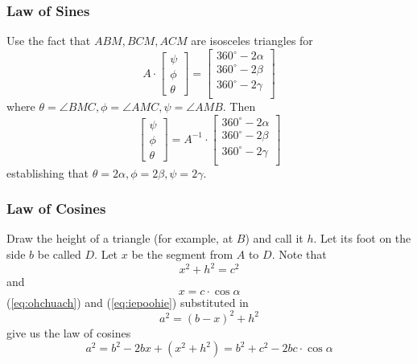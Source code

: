 \documentclass[xcolor=dvipsnames]{beamer}
\begin{document}
\begin{frame}
  \frametitle{Law of Sines}
    Use the fact that $ABM,BCM,ACM$ are isosceles triangles for
    \begin{equation}
      \label{eq:exiebohc}
      A\cdot\left[\begin{array}{c}
        \psi \\
              \phi \\
              \theta
            \end{array}\right]=\left[
            \begin{array}{c}
              360^{\circ}-2\alpha \\
              360^{\circ}-2\beta \\
              360^{\circ}-2\gamma \\
            \end{array}\right]
        \end{equation}
        where $\theta=\angle{}BMC,\phi=\angle{}AMC,\psi=\angle{}AMB$.
        Then
        \begin{equation}
          \label{eq:taineich}
          \left[\begin{array}{c}
        \psi \\
              \phi \\
              \theta
            \end{array}\right]=A^{-1}\cdot\left[
            \begin{array}{c}
              360^{\circ}-2\alpha \\
              360^{\circ}-2\beta \\
              360^{\circ}-2\gamma \\
            \end{array}\right]
        \end{equation}
        establishing that $\theta=2\alpha,\phi=2\beta,\psi=2\gamma$.
\end{frame}

\begin{frame}
  \frametitle{Law of Cosines}
Draw the height of a triangle (for example, at $B$) and call it $h$.
Let its foot on the side $b$ be called $D$. Let $x$ be the segment from
$A$ to $D$. Note that
\begin{equation}
  \label{eq:ohchuach}
  x^{2}+h^{2}=c^{2}
\end{equation}
and
\begin{equation}
  \label{eq:iepoohie}
  x=c\cdot\cos{}\alpha
\end{equation}
(\ref{eq:ohchuach}) and (\ref{eq:iepoohie}) substituted in
\begin{equation}
  \label{eq:uezaique}
  a^{2}=(b-x)^{2}+h^{2}
\end{equation}
give us the \alert{law of cosines}
\begin{equation}
  \label{eq:aiwugith}
  a^{2}=b^{2}-2bx+(x^{2}+h^{2})=b^{2}+c^{2}-2bc\cdot\cos\alpha
\end{equation}
\end{frame}
\end{document}
